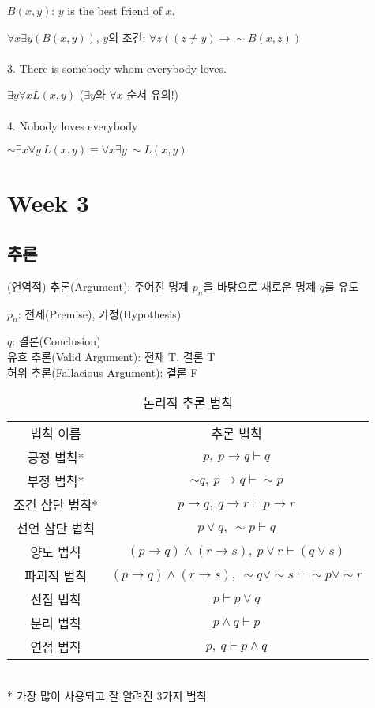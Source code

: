 $B(x, y)$: $y$ is the best friend of $x$.

$\forall x \exists y (B(x, y))$, $y$의 조건: $\forall z((z\neq y) \to \sim B(x, z))$\\\\
3. There is somebody whom everybody loves.

$\exists y\forall x L(x, y)$ ($\exists y$와 $\forall x$ 순서 유의!)\\\\
4. Nobody loves everybody

$\sim \exists x \forall y\ L(x, y) \equiv \forall x \exists y\ \sim L(x, y)$
\section{Week 3}
\subsection{추론}
(연역적) 추론(Argument): 주어진 명제 $p_n$을 바탕으로 새로운 명제 $q$를 유도

$p_n$: 전제(Premise), 가정(Hypothesis)

$q$: 결론(Conclusion)\\
유효 추론(Valid Argument): 전제 T, 결론 T\\
허위 추론(Fallacious Argument): 결론 F
\begin{table}[H]
    \caption {논리적 추론 법칙}
    \centering
    \begin{tabular}{c|c}
        법칙 이름&추론 법칙\\
        \Xhline{3\arrayrulewidth}
        긍정 법칙*&$p,\ p\to q\vdash q$\\
        \hline
        부정 법칙*&$\sim q,\ p \to q\vdash \sim p$\\
        \hline
        조건 삼단 법칙*&$p \to q,\ q \to r\vdash p \to r$\\
        \hline
        선언 삼단 법칙&$p \lor q,\ \sim p\vdash q$\\
        \hline
        양도 법칙&$(p\to q)\land(r\to s),\ p\lor r\vdash (q\lor s)$\\
        \hline
        파괴적 법칙&$(p\to q)\land(r\to s),\ \sim q \lor \sim s\vdash \sim p \lor \sim r$\\
        \hline
        선접 법칙&$p \vdash p \lor q$\\
        \hline
        분리 법칙&$p \land q\vdash p$\\
        \hline
        연접 법칙&$p,\ q\vdash p \land q$
    \end{tabular}
    \\
    \bigskip
    * 가장 많이 사용되고 잘 알려진 3가지 법칙
\end{table}

